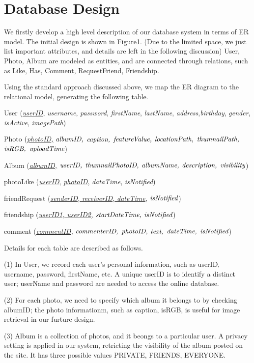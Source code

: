 \documentclass[a4paper,12pt]{article}
\begin{document}
\section*{Database Design}
We firstly develop a high level description of our database system in terms of ER model. The initial design is shown in Figure1. (Due to the limited space, we just list important attributes, and details are left in the following discussion) User, Photo, Album are modeled as entities, and are connected through relations, such as Like, Has, Comment, RequestFriend, Friendship.

Using the standard approach discussed above, we map the ER diagram to the relational model, generating the following table.

User (\emph{\underline{userID}}, \emph{username}, \emph{password}, \emph{firstName}, \emph{lastName}, \emph{address},\emph{birthday}, \emph{gender}, \emph{isActive}, \emph{imagePath})

Photo (\underline{\emph{photoID,}} $\emph{albumID,}$ $\emph{caption,}$ $\emph{featureValue,}$ $\emph{locationPath,}$ $\emph{thumnailPath,}$ $\emph{isRGB,}$ $\emph{uploadTime}$)

Album (\underline{\emph{albumID,}} $\emph{userID,}$ $\emph{thumnailPhotoID,}$ $\emph{albumName,}$ $\emph{description,}$ $\emph{visibility}$)

photoLike (\emph{\underline{userID}}, \emph{\underline{photoID}}, \emph{dataTime}, \emph{isNotified})

friendRequest (\underline{\emph{senderID,} \emph{receiverID,} \emph{dateTime,}} $\emph{isNotified}$)

friendship (\underline{\emph{userID1,} \emph{userID2,}} $\emph{startDateTime,}$ $\emph{isNotified}$)

comment (\underline{\emph{commentID,}} $\emph{commenterID,}$ $\emph{photoID,}$ $\emph{text,}$ $\emph{dateTime,}$ $\emph{isNotified}$)


Details for each table are described as follows.

(1) In User, we record each user's personal information, such as userID, username, password, firstName, etc. A unique userID is to identify a distinct user; userName and password are needed to access the online database.

(2) For each photo, we need to specify which album it belongs to by checking albumID; the photo informationm, such as caption, isRGB, is useful for image retrieval in our furture design.

(3) Album is a collection of photos, and it beongs to a particular user. A privacy setting is applied in our system, retricting the visibility of the album posted on the site. It has three possible values PRIVATE, FRIENDS, EVERYONE.
\end{document}

